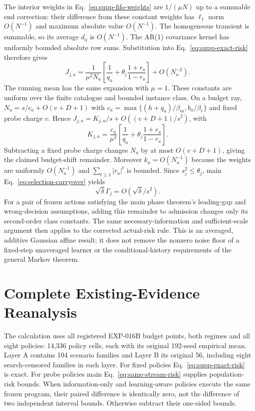 \documentclass[journal]{IEEEtran}
\begin{document}
The interior weights in Eq.~\eqref{eq:supp-fifo-weights} are $1/(\mu N)$ up to a summable end correction: their difference from these constant weights has $\ell_1$ norm $O(N^{-1})$ and maximum absolute value $O(N^{-1})$.
The homogeneous transient is summable, so its average $d_a$ is $O(N^{-1})$.
The AR(1) covariance kernel has uniformly bounded absolute row sums.
Substitution into Eq.~\eqref{eq:supp-exact-risk} therefore gives
\begin{equation}
J_{j,a}=\frac1{\mu^2N_a}\left[\frac1{q_a}+\theta_j\frac{1+r_a}{1-r_a}\right]+O(N_a^{-2}).
\label{eq:supp-averaged-rate}
\end{equation}
The running mean has the same expansion with $\mu=1$.
These constants are uniform over the finite catalogue and bounded instance class.
On a budget ray, $N_a=s/c_a+O(v+D+1)$ with $c_a=\max\{(h+q_a)/\beta_m,b_a/\beta_e\}$ and fixed probe charge $v$.
Hence $J_{j,a}=K_{j,a}/s+O((v+D+1)/s^2)$, with
\begin{equation}
K_{j,a}=\frac{c_a}{\mu^2}\left[\frac1{q_a}+\theta_j\frac{1+r_a}{1-r_a}\right].
\end{equation}
Subtracting a fixed probe charge changes $N_a$ by at most $O(v+D+1)$, giving the claimed budget-shift remainder.
Moreover $k_a=O(N_a^{-1})$ because the weights are uniformly $O(N_a^{-1})$ and $\sum_{t\ge1}|r_a|^t$ is bounded.
Since $s_j^2\le\theta_j$, main Eq.~\eqref{eq:selection-carryover} yields
\begin{equation}
\sqrt\delta\Gamma_j=O(\sqrt\delta/s^2).
\end{equation}
For a pair of frozen actions satisfying the main phase theorem's leading-gap and wrong-decision assumptions, adding this remainder to admission changes only its second-order class constants.
The same necessary-information and sufficient-scale argument then applies to the corrected actual-risk rule.
This is an averaged, additive Gaussian affine result; it does not remove the nonzero noise floor of a fixed-step unaveraged learner or the conditional-history requirements of the general Markov theorem.

\section{Complete Existing-Evidence Reanalysis}
The calculation uses all registered EXP-016B budget points, both regimes and all eight policies: 14,336 policy cells, each with its original 192-seed empirical mean.
Layer A contains 104 scenario families and Layer B its original 56, including eight search-censored families in each layer.
For fixed policies Eq.~\eqref{eq:supp-exact-risk} is exact.
For probe policies main Eq.~\eqref{eq:same-stream-risk} supplies population-risk bounds.
When information-only and learning-aware policies execute the same frozen program, their paired difference is identically zero, not the difference of two independent interval bounds.
Otherwise subtract their one-sided bounds.
\end{document}
